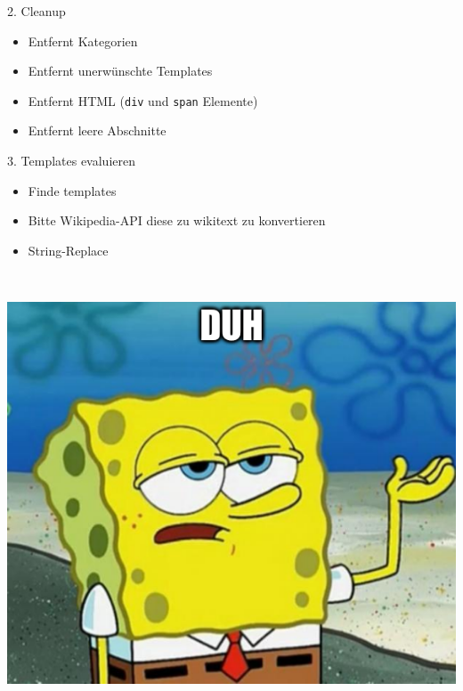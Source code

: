 \documentclass[9pt]{beamer}
\begin{document}
	\begin{frame}{2. Cleanup}
		\begin{itemize}
			\item Entfernt Kategorien
			\item Entfernt unerwünschte Templates
			\item Entfernt HTML (\texttt{div} und \texttt{span} Elemente)
			\item Entfernt leere Abschnitte
		\end{itemize}
	\end{frame}


	\begin{frame}{3. Templates evaluieren}
		\begin{itemize}
			\item Finde templates
			\item Bitte Wikipedia-API diese zu wikitext zu konvertieren
			\item String-Replace
		\end{itemize}
		~\\
		\pause
		\begin{center}
			\includegraphics[height=0.5\textheight]{images/meme-spongebob-duh.png}
		\end{center}
	\end{frame}
\end{document}
